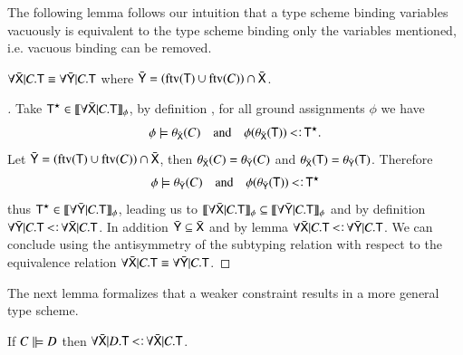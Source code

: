 \documentclass{report}
\begin{document}
  The following lemma follows our intuition that a type scheme binding
  variables vacuously is equivalent to the type scheme binding only the variables mentioned,
  i.e. vacuous binding can be removed.
  \begin{lemma}
    $\forall\bar{\textsf{X}}|C.\textsf{T}\equiv\forall\bar{\textsf{Y}}|C.\textsf{T}$
    where $\bar{\textsf{Y}}=\left({\mathop{\rm ftv}\nolimits(\textsf{T})\cup\mathop{\rm ftv}\nolimits(C)}\right)\cap\bar{\textsf{X}}$.
  \end{lemma}
  \begin{proof}[]
    Take $\textsf{T}^\star\in\llbracket{\forall\bar{\textsf{X}}|C.\textsf{T}}\rrbracket_{\phi}$, by definition
    , for all ground assignments $\phi$ we have
    \begin{displaymath}
      \phi\csat\theta_{\bar{\type{X}}}(C) \quad\textrm{and}\quad
      \phi(\theta_{\bar{\type{X}}}(\type{T}))\subtype\type{T}^\star\textrm{.}
    \end{displaymath}
    Let $\bar{\textsf{Y}}=\left({\mathop{\rm ftv}\nolimits(\textsf{T})\cup\mathop{\rm ftv}\nolimits(C)}\right)\cap\bar{\textsf{X}}$, then
    $\theta_{\bar{\textsf{X}}}(C)=\theta_{\bar{\textsf{Y}}}(C)$ and
    $\theta_{\bar{\textsf{X}}}(\textsf{T})=\theta_{\bar{\textsf{Y}}}(\textsf{T})$. Therefore
    \begin{displaymath}
      \phi\csat\theta_{\bar{\type{Y}}}(C) \quad\textrm{and}\quad
      \phi(\theta_{\bar{\type{Y}}}(\type{T}))\subtype\type{T}^\star
    \end{displaymath}
    thus $\textsf{T}^\star\in\llbracket{\forall\bar{\textsf{Y}}|C.\textsf{T}}\rrbracket_{\phi}$, leading us
    to $\llbracket{\forall\bar{\textsf{X}}|C.\textsf{T}}\rrbracket_{\phi}\subseteq\llbracket{\forall\bar{\textsf{Y}}|C.\textsf{T}}\rrbracket_{\phi}$
    and by definition 
    $\forall\bar{\type{Y}}|C.\type{T}\subtype\forall\bar{\type{X}}|C.\type{T}$.
    In addition $\bar{\textsf{Y}}\subseteq\bar{\textsf{X}}$ and by lemma 
    $\forall\bar{\type{X}}|C.\type{T}\subtype\forall\bar{\type{Y}}|C.\type{T}$. We can
    conclude using the antisymmetry of the subtyping relation with respect to the equivalence
    relation 
    $\forall\bar{\textsf{X}}|C.\textsf{T}\equiv\forall\bar{\textsf{Y}}|C.\textsf{T}$.
  \end{proof}
  The next lemma formalizes that a weaker constraint results in a more general type scheme.
  \begin{lemma}
    If $C\mathrel|\models D$ then
    $\forall\bar{\type{X}}|D.\type{T}\subtype\forall\bar{\type{X}}|C.\type{T}$.
  \end{lemma}
\end{document}
